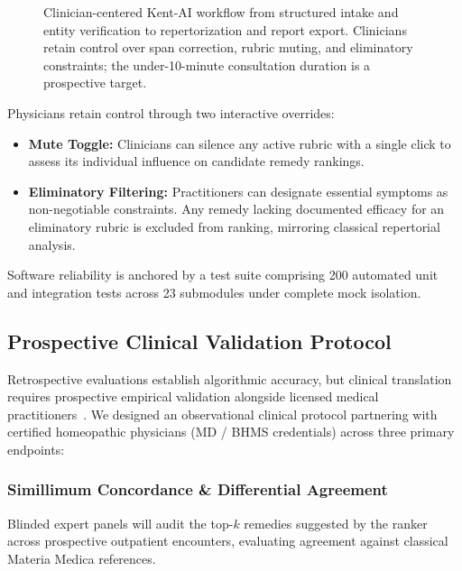 \begin{figure}[!t]
{%
}
\caption{Clinician-centered Kent-AI workflow from structured intake and entity verification to repertorization and report export. Clinicians retain control over span correction, rubric muting, and eliminatory constraints; the under-10-minute consultation duration is a prospective target.}
\label{fig:clinical_workflow}
\end{figure}


Physicians retain control through two interactive overrides:
\begin{itemize}
    \item \textbf{Mute Toggle:} Clinicians can silence any active rubric with a single click to assess its individual influence on candidate remedy rankings.
    \item \textbf{Eliminatory Filtering:} Practitioners can designate essential symptoms as non-negotiable constraints. Any remedy lacking documented efficacy for an eliminatory rubric is excluded from ranking, mirroring classical repertorial analysis.
\end{itemize}

Software reliability is anchored by a test suite comprising 200 automated unit and integration tests across 23 submodules under complete mock isolation.

\subsection{Prospective Clinical Validation Protocol}

Retrospective evaluations establish algorithmic accuracy, but clinical translation requires prospective empirical validation alongside licensed medical practitioners~\cite{gulshan2016development}. We designed an observational clinical protocol partnering with certified homeopathic physicians (MD / BHMS credentials) across three primary endpoints:

\subsubsection{Simillimum Concordance \& Differential Agreement}
Blinded expert panels will audit the top-$k$ remedies suggested by the ranker across prospective outpatient encounters, evaluating agreement against classical Materia Medica references.

